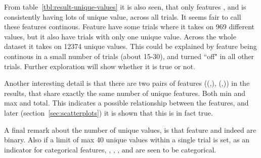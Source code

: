 From table~\ref{tbl:result-unique-values} it is also seen, that only features ,  and  is consistently having lots of unique value, across all trials. It seems fair to call these features continous. Feature  have some trials where it takes on 969 different values, but it also have trials with only one unique value. Across the whole dataset it takes on 12374 unique values. This could be explained by feature  being continous in a small number of trials (about 15-30), and turned ``off" in all other trials. Further exploration will show whether it is true or not. \par

Another interesting detail is that there are two pairs of features ((,), (,)) in the results, that share exactly the same number of unique features. Both min and max and total. This indicates a possible relationship between the features, and later (section~\ref{sec:scatterplots}) it is shown that this is in fact true. \par

A final remark about the number of unique values, is that feature  and  indeed are binary. Also if a limit of max 40 unique values within a single trial is set, as an indicator for categorical features, , , ,  and  are seen to be categorical. \par

